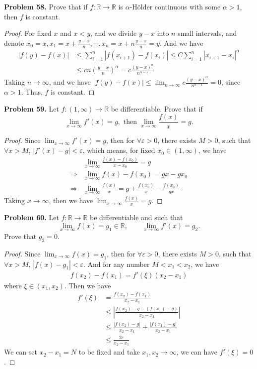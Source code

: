 \documentclass[12pt,leqno]{amsart}
\begin{document}
\noindent
{\bf Problem 58.}
Prove that if $f:\mathbb{R}\to\mathbb{R}$ is $\alpha$-H\"{o}lder continuous with some $\alpha>1$, then $f$ is constant.
\begin{proof}
For fixed $x$ and $x<y$, and we divide $y-x$ into $n$ small intervals, and denote $x_0=x, x_1=x+\frac{y-x}{n},\cdots, x_{n}=x+n\frac{y-x}{n}=y$. And we have 
\begin{align*}
    |f(y)-f(x)| &\leq \sum^{n}_{i=1}|f(x_{i+1})-f(x_i)|\leq C \sum^{n}_{i=1} |x_{i+1}-x_i|^\alpha \\
    & \leq c n \left(\frac{y-x}{n}\right)^\alpha = c \frac{(y-x)^\alpha}{n^{\alpha-1}}
\end{align*}
Taking $n\to\infty$, and we have $|f(y)-f(x)|\leq \lim_{n\to\infty}c \frac{(y-x)^\alpha}{n^{\alpha-1}} =0$, since $\alpha>1$. Thus, $f$ is constant.
\end{proof}

\medskip

\noindent
{\bf Problem 59.}
Let $f:(1,\infty)\to\mathbb{R}$ be differentiable. Prove that if
$$
\lim_{x\to\infty} f'(x) = g,\text{ then }\lim_{x\to\infty }\frac{f(x)}{x} = g.
$$
\begin{proof}
Since $\lim_{x\to\infty} f'(x) = g$, then for $\forall \varepsilon >0$, there exists $M>0$, such that $\forall x>M$, $|f'(x)-g |<\varepsilon$, which means, for fixed $x_0\in(1,\infty)$, we have
\begin{align*}
    &\lim_{x\to\infty}\frac{f(x)-f(x_0)}{x-x_0}=g \\
    \Rightarrow & \lim_{x\to\infty} f(x)-f(x_0)=g x-gx_0 \\
    \Rightarrow & \lim_{x\to\infty} \frac{f(x)}{x}=g+\frac{f(x_0)}{x}-\frac{f(x_0)}{gx}
\end{align*}
Taking $x\to\infty$, then we have $\lim_{x\to\infty }\frac{f(x)}{x} = g$.
\end{proof}

\medskip

\noindent
{\bf Problem 60.}
Let $f:\mathbb{R}\to\mathbb{R}$ be differentiable and such that
$$
\lim_{x\to \infty} f(x)=g_1\in\mathbb{R},
\qquad
\lim_{x\to\infty} f'(x) = g_2.
$$
Prove that $g_2=0$.
\begin{proof}
Since $\lim_{x\to \infty} f(x)=g_1$, then for $\forall \varepsilon >0$, there exists $M>0$, such that $\forall x>M$, $|f(x)-g_1|<\varepsilon$. And for any number $M<x_1<x_2$, we have
\begin{align*}
    f(x_2)-f(x_1) = f'(\xi)(x_2-x_1)
\end{align*}
where $\xi\in(x_1,x_2)$. Then we have 
\begin{align*}
    f'(\xi) &=\frac{f(x_2)-f(x_1)}{x_2-x_1} \\
    & \leq \left|\frac{f(x_2)-g-(f(x_1)-g)}{x_2-x_1}  \right| \\
    & \leq \frac{\left|f(x_2)-g\right|}{x_2-x_1} + \frac{\left|f(x_1)-g\right|}{x_2-x_1} \\
    & \leq \frac{2\varepsilon}{x_2-x_1}
\end{align*}
We can set $x_2-x_1=N$ to be fixed and take $x_1,x_2\rightarrow \infty$, we can have $f'(\xi)=0$.
\end{proof}
\end{document}
